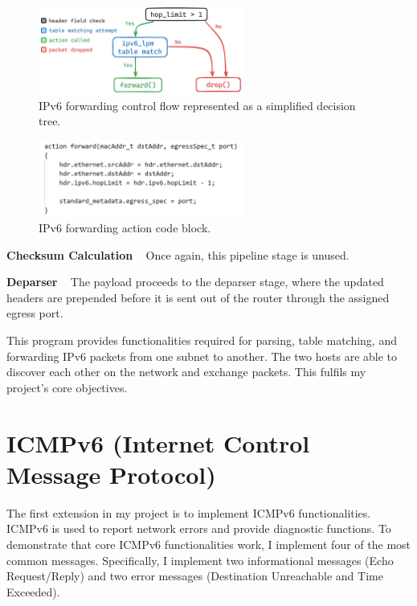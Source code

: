 \begin{figure}[htbp]
  \centering
    \includegraphics[width=0.6\textwidth]{figures/implementation/ipv6_apply.jpg}
     \caption{IPv6 forwarding control flow represented as a simplified decision tree.}
     \label{fig:impl-ipv6apply}
\end{figure}

\begin{figure}[htbp]
  \centering
    \includegraphics[width=0.6\textwidth]{figures/implementation/ipv6_forward.png}
     \caption{IPv6 forwarding action code block.}
     \label{fig:impl-ipv6forward}
\end{figure}

\textbf{Checksum Calculation} ~ Once again, this pipeline stage is unused.

\textbf{Deparser} ~ The payload proceeds to the deparser stage, where the updated headers are prepended before it is sent out of the router through the assigned egress port.

This program provides functionalities required for parsing, table matching, and forwarding IPv6 packets from one subnet to another. The two hosts are able to discover each other on the network and exchange packets. This fulfils my project's core objectives.


\section{ICMPv6 (Internet Control Message Protocol)}
\label{sec:3.5}

The first extension in my project is to implement ICMPv6 functionalities. ICMPv6 is used to report network errors and provide diagnostic functions. To demonstrate that core ICMPv6 functionalities work, I implement four of the most common messages. Specifically, I implement two informational messages (Echo Request/Reply) and two error messages (Destination Unreachable and Time Exceeded). 



